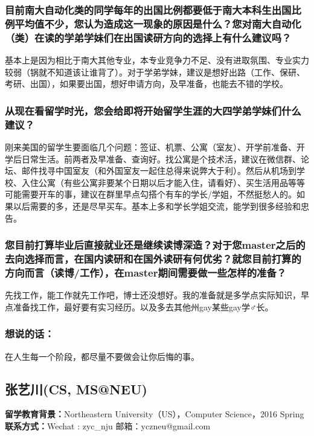 \documentclass[a4paper,UTF8]{book}
\begin{document}
    \subsubsection*{目前南大自动化类的同学每年的出国比例都要低于南大本科生出国比例平均值不少，您认为造成这一现象的原因是什么？您对南大自动化（类）在读的学弟学妹们在出国读研方向的选择上有什么建议吗？}
    基本上是因为相比于南大其他专业，本专业竞争力不足、没有进取氛围、专业实力较弱（锅就不知道该让谁背了）。对于学弟学妹，建议是想好出路（工作、保研、考研、出国），如果要出国，想好申请方向，及早准备，也能去不错的学校。

    \subsubsection*{从现在看留学时光，您会给即将开始留学生涯的大四学弟学妹们什么建议？}
    刚来美国的留学生要面临几个问题：签证、机票、公寓（室友）、开学前准备、开学后日常生活。前两者及早准备、查询好。找公寓是个技术活，建议在微信群、论坛、邮件找寻中国室友（和外国室友一起住总得来说弊大于利）。然后从机场到学校、入住公寓（有些公寓非要某个日期以后才能入住，请看好）、买生活用品等等可能需要开车的事，建议在群里早点勾搭个有车的学长/学姐，不然挺愁人的。如果以后需要的多，还是尽早买车。基本上多和学长学姐交流，能学到很多经验和忠告。

    \subsubsection*{您目前打算毕业后直接就业还是继续读博深造？对于您master之后的去向选择而言，在国内读研和在国外读研有何优劣？就您目前打算的方向而言（读博/工作），在master期间需要做一些怎样的准备？}
    先找工作，能工作就先工作吧，博士还没想好。我的准备就是多学点实际知识，早点准备找工作，最好要有实习经历。以及多去其他州gay某些gay学$\male$长。

    \subsubsection{想说的话：}
    在人生每一个阶段，都尽量不要做会让你后悔的事。

\clearpage
\subsection{张艺川(CS, MS@NEU)}
    \textbf{留学教育背景：}Northeastern University（US），Computer Science，2016 Spring\\
    \textbf{联系方式：}Wechat : zyc\_nju  邮箱：yczneu@gmail.com
\end{document}
